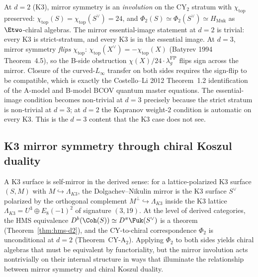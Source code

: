 \begin{remark}[Why \texorpdfstring{$d = 3$}{d = 3} sharpens the \texorpdfstring{$d = 2$}{d = 2} picture]
\label{rem:mirror-d3-vs-d2}
At $d = 2$ (K3), mirror symmetry is an \emph{involution} on the CY$_2$ stratum with $\chi_{\mathrm{top}}$ preserved: $\chi_{\mathrm{top}}(S) = \chi_{\mathrm{top}}(S^\vee) = 24$, and $\Phi_2(S) \simeq \Phi_2(S^\vee) \simeq H_{\mathrm{Muk}}$ as $\Etwo$-chiral algebras. The mirror essential-image statement at $d = 2$ is trivial: every K3 is strict-stratum, and every K3 is in the essential image. At $d = 3$, mirror symmetry \emph{flips} $\chi_{\mathrm{top}}$: $\chi_{\mathrm{top}}(X^\vee) = -\chi_{\mathrm{top}}(X)$ (Batyrev 1994 Theorem~4.5), so the B-side obstruction $\chi(X)/24 \cdot \lambda_g^{\mathrm{FP}}$ flips sign across the mirror. Closure of the curved-$L_\infty$ transfer on both sides requires the sign-flip to be compatible, which is exactly the Costello--Li 2012 Theorem~1.2 identification of the A-model and B-model BCOV quantum master equations. The essential-image condition becomes non-trivial at $d = 3$ precisely because the strict stratum is non-trivial at $d = 3$; at $d = 2$ the Kapranov weight-$2$ condition is automatic on every K3. This is the $d = 3$ content that the K3 case does not see.
\end{remark}

\subsection{K3 mirror symmetry through chiral Koszul duality}
\label{subsec:k3-mirror-koszul}

A K3 surface is self-mirror in the derived sense: for a lattice-polarized K3 surface $(S, M)$ with $M \hookrightarrow \Lambda_{K3}$, the Dolgachev--Nikulin mirror is the K3 surface $S^\vee$ polarized by the orthogonal complement $M^\perp \hookrightarrow \Lambda_{K3}$ inside the K3 lattice $\Lambda_{K3} = U^3 \oplus E_8(-1)^2$ of signature $(3,19)$. At the level of derived categories, the HMS equivalence $D^b(\Coh(S)) \simeq D^\pi\Fuk(S^\vee)$ is a theorem (Theorem~\ref{thm:hms-d2}), and the CY-to-chiral correspondence $\Phi_2$ is unconditional at $d = 2$ (Theorem~CY-A$_2$). Applying $\Phi_2$ to both sides yields chiral algebras that must be equivalent by functoriality, but the mirror involution acts nontrivially on their internal structure in ways that illuminate the relationship between mirror symmetry and chiral Koszul duality.

